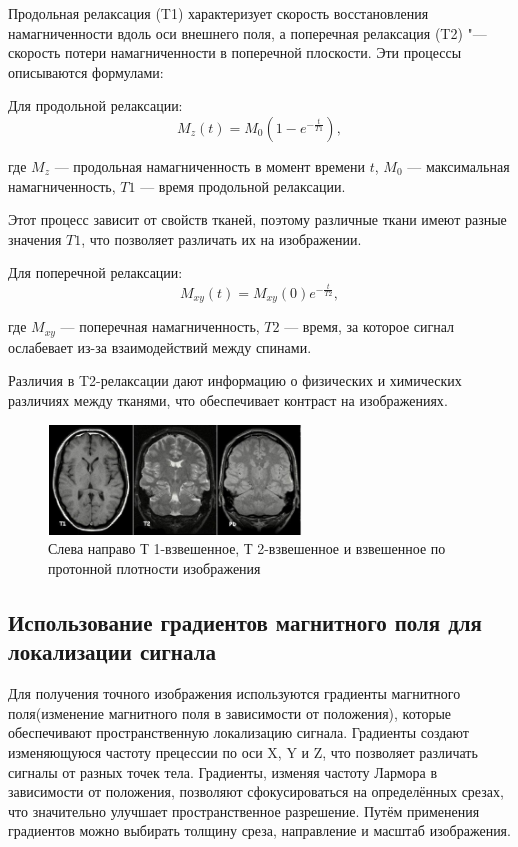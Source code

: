 Продольная релаксация (T1) характеризует скорость восстановления намагниченности вдоль оси внешнего поля, а поперечная релаксация (T2) "--- скорость потери намагниченности в поперечной плоскости. Эти процессы описываются формулами:

Для продольной релаксации:
\[
M_z(t) = M_0 \left(1 - e^{-\frac{t}{T1}}\right),
\]

где \(M_z\) — продольная намагниченность в момент времени \(t\), \(M_0\) — максимальная намагниченность, \(T1\) — время продольной релаксации. 

Этот процесс зависит от свойств тканей, поэтому различные ткани имеют разные значения \(T1\), что позволяет различать их на изображении\cite{ktmrt}.

Для поперечной релаксации:
\[
M_{xy}(t) = M_{xy}(0) e^{-\frac{t}{T2}},
\]

где \(M_{xy}\) — поперечная намагниченность, \(T2\) — время, за которое сигнал ослабевает из-за взаимодействий между спинами. 

Различия в T2-релаксации дают информацию о физических и химических различиях между тканями, что обеспечивает контраст на изображениях\cite{ktmrt}.

\begin{figure}[H]
    \centering
    \includegraphics[width=0.6\textwidth]{pic/9.png}
    \caption{Слева направо Т 1-взвешенное, Т 2-взвешенное и взвешенное по протонной плотности изображения}
    \label{fig:image1}
\end{figure}

\subsection{Использование градиентов магнитного поля для локализации сигнала}

Для получения точного изображения используются градиенты магнитного поля(изменение магнитного поля в зависимости от положения), которые обеспечивают пространственную локализацию сигнала. Градиенты создают изменяющуюся частоту прецессии по оси X, Y и Z, что позволяет различать сигналы от разных точек тела. Градиенты, изменяя частоту Лармора в зависимости от положения, позволяют сфокусироваться на определённых срезах, что значительно улучшает пространственное разрешение. Путём применения градиентов можно выбирать толщину среза, направление и масштаб изображения\cite{ktmrt}.

